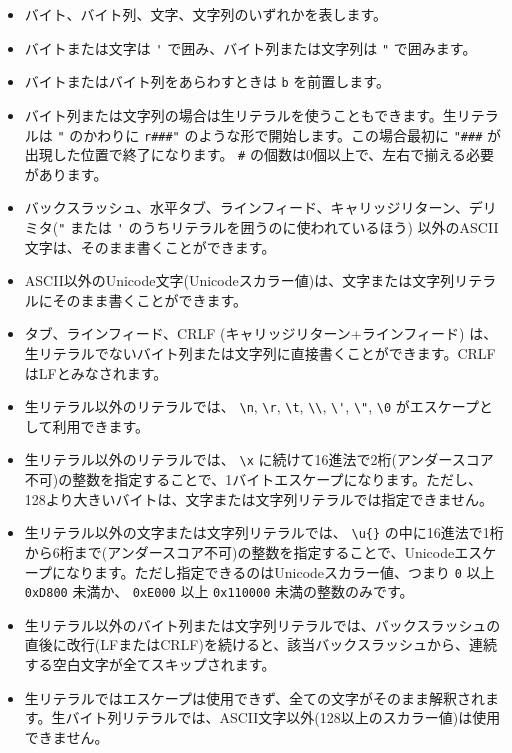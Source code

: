 \documentclass[dvipdfmx,uplatex,papersize,a4paper,10pt]{jsbook}
\theoremstyle{definition}
\begin{document}
\begin{itemize}
  \item バイト、バイト列、文字、文字列のいずれかを表します。
  \item バイトまたは文字は \verb|'| で囲み、バイト列または文字列は \verb|"| で囲みます。
  \item バイトまたはバイト列をあらわすときは \verb|b| を前置します。
  \item バイト列または文字列の場合は生リテラルを使うこともできます。生リテラルは \verb|"| のかわりに \verb|r###"| のような形で開始します。この場合最初に \verb|"###| が出現した位置で終了になります。 \verb|#| の個数は0個以上で、左右で揃える必要があります。
  \item バックスラッシュ、水平タブ、ラインフィード、キャリッジリターン、デリミタ(\verb|"| または \verb|'| のうちリテラルを囲うのに使われているほう) 以外のASCII文字は、そのまま書くことができます。
  \item ASCII以外のUnicode文字(Unicodeスカラー値)は、文字または文字列リテラルにそのまま書くことができます。
  \item タブ、ラインフィード、CRLF (キャリッジリターン+ラインフィード) は、生リテラルでないバイト列または文字列に直接書くことができます。CRLFはLFとみなされます。
  \item 生リテラル以外のリテラルでは、 \verb|\n|, \verb|\r|, \verb|\t|, \verb|\\|, \verb|\'|, \verb|\"|, \verb|\0| がエスケープとして利用できます。
  \item 生リテラル以外のリテラルでは、 \verb|\x| に続けて16進法で2桁(アンダースコア不可)の整数を指定することで、1バイトエスケープになります。ただし、 128より大きいバイトは、文字または文字列リテラルでは指定できません。
  \item 生リテラル以外の文字または文字列リテラルでは、 \verb|\u{}| の中に16進法で1桁から6桁まで(アンダースコア不可)の整数を指定することで、Unicodeエスケープになります。ただし指定できるのはUnicodeスカラー値、つまり \verb|0| 以上 \verb|0xD800| 未満か、 \verb|0xE000| 以上 \verb|0x110000| 未満の整数のみです。
  \item 生リテラル以外のバイト列または文字列リテラルでは、バックスラッシュの直後に改行(LFまたはCRLF)を続けると、該当バックスラッシュから、連続する空白文字が全てスキップされます。
  \item 生リテラルではエスケープは使用できず、全ての文字がそのまま解釈されます。生バイト列リテラルでは、ASCII文字以外(128以上のスカラー値)は使用できません。
\end{itemize}
\end{document}
